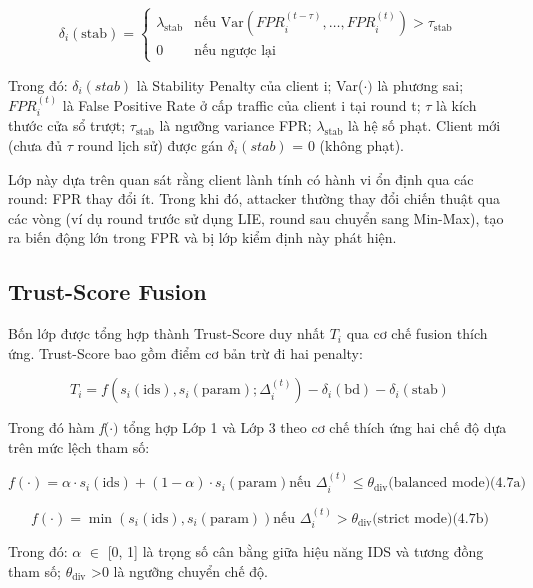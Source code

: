 \begin{equation}
\delta_{i}(\text{stab}) = \begin{cases}
  \lambda_{\text{stab}} & \text{nếu Var}(FPR_{i}^{\left( t-\tau \right)},\ldots,FPR_{i}^{(t)}) > \tau_{\text{stab}} \\
  0 & \text{nếu ngược lại}
\end{cases}\
\tag{4.5}
\end{equation}

Trong đó: $\delta_{i}(stab)$ là Stability Penalty của client i; Var($\cdot)$ là phương sai; $FPR_{i}^{(t)}$ là False Positive Rate ở cấp traffic của client i tại round t; $\tau$ là kích thước cửa sổ trượt; $\tau_{\text{stab}}$ là ngưỡng variance FPR; $\lambda_{\text{stab}}$ là hệ số phạt. Client mới (chưa đủ $\tau$ round lịch sử) được gán $\delta_{i}(stab)$ = 0 (không phạt).

Lớp này dựa trên quan sát rằng client lành tính có hành vi ổn định qua các round: FPR thay đổi ít. Trong khi đó, attacker thường thay đổi chiến thuật qua các vòng (ví dụ round trước sử dụng LIE, round sau chuyển sang Min-Max), tạo ra biến động lớn trong FPR và bị lớp kiểm định này phát hiện.

\subsection{Trust-Score Fusion}
Bốn lớp được tổng hợp thành Trust-Score duy nhất $T_{i}$ qua cơ chế fusion thích ứng. Trust-Score bao gồm điểm cơ bản trừ đi hai penalty:

\begin{equation}
T_{i} = f(s_{i}(\text{ids}),s_{i}(\text{param});\Delta_{i}^{(t)}) - \delta_{i}(\text{bd}) - \delta_{i}(\text{stab})
\tag{4.6}
\end{equation}

Trong đó hàm \emph{f}($\cdot)$ tổng hợp Lớp 1 và Lớp 3 theo cơ chế thích ứng hai chế độ dựa trên mức lệch tham số:

\[f( \cdot ) = \alpha \cdot s_{i}(\text{ids}) + (1 - \alpha) \cdot s_{i}(\text{param})\text{nếu }\Delta_{i}^{(t)} \leq \theta_{\text{div}}\text{(balanced mode)(4.7a)}\]

\[f( \cdot ) = \min(s_{i}(\text{ids}),s_{i}(\text{param}))\text{nếu }\Delta_{i}^{(t)} > \theta_{\text{div}}\text{(strict mode)(4.7b)}\]

Trong đó: $\alpha$ $\in$ {[}0, 1{]} là trọng số cân bằng giữa hiệu năng IDS và tương đồng tham số; $\theta_{\text{div}}$ \textgreater 0 là ngưỡng chuyển chế độ.

